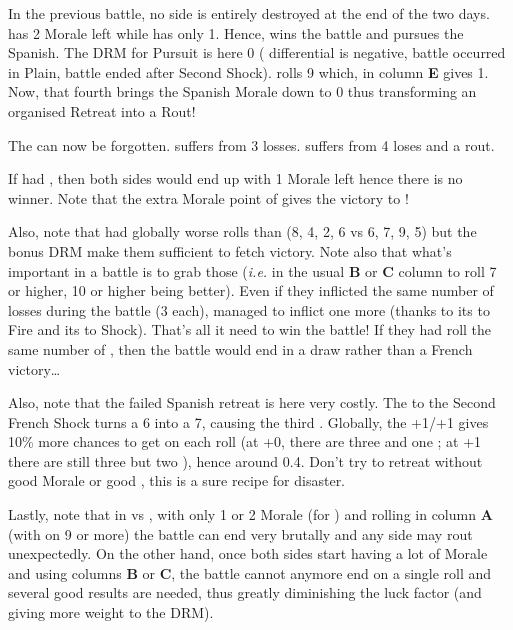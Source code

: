 \begin{exemple}[Pursuit]
  In the previous battle, no side is entirely destroyed at the end of the two
  days. \FRA has 2 Morale left while \HIS has only 1. Hence, \FRA wins the
  battle and pursues the Spanish. The DRM for Pursuit is here 0 (\Shock
  differential is negative, battle occurred in Plain, battle ended after
  Second Shock). \FRA rolls 9 which, in column \textbf{E} gives
  1\textetoile. Now, that fourth \textetoile brings the Spanish Morale down to
  0 thus transforming an organised Retreat into a Rout!

  The \textetoile can now be forgotten. \FRA suffers from 3 losses. \HIS
  suffers from 4 loses and a rout.

  \smallskip

  If \FRA had , then both sides would end up with 1 Morale
  left hence there is no winner. Note that the extra Morale point of
   gives the victory to \FRA!

  \smallskip

  Also, note that \FRA had globally worse rolls than \HIS (8, 4, 2, 6 vs 6, 7,
  9, 5) but the bonus DRM make them sufficient to fetch victory. Note also
  that what's important in a battle is to grab those \textetoile (\emph{i.e.}
  in the usual \textbf{B} or \textbf{C} column to roll 7 or higher, 10 or
  higher being better). Even if they inflicted the same number of losses
  during the battle (3 each), \FRA managed to inflict one more \textetoile
  (thanks to its  to Fire and its  to Shock). That's all
  it need to win the battle! If they had roll the same number of \textetoile,
  then the battle would end in a draw rather than a French victory\ldots

  Also, note that the failed Spanish retreat is here very costly. The
   to the Second French Shock turns a 6 into a 7, causing the third
  \textetoile. Globally, the +1/+1 gives 10\% more chances to get
  \textetoile\textetoile on each roll (at +0, there are three \textetoile and
  one \textetoile\textetoile; at +1 there are still three \textetoile but two
  \textetoile\textetoile), hence around 0.4\textetoile. Don't try to retreat
  without good Morale or good \Man, this is a sure recipe for disaster.

  Lastly, note that in \TMED vs \TMED, with only 1 or 2 Morale (for
  ) and rolling in column \textbf{A} (with
  \textetoile\textetoile on 9 or more) the battle can end very brutally and
  any side may rout unexpectedly. On the other hand, once both sides start
  having a lot of Morale and using columns \textbf{B} or \textbf{C}, the
  battle cannot anymore end on a single roll and several good results are
  needed, thus greatly diminishing the luck factor (and giving more weight to
  the DRM).
\end{exemple}

